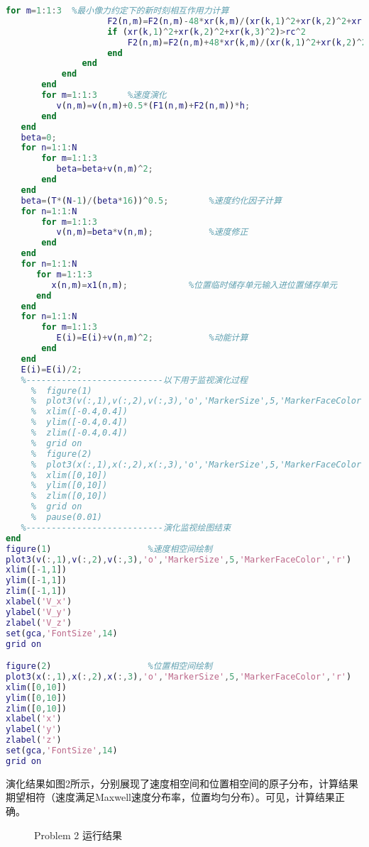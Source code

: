 \documentclass{article}
\begin{document}
\begin{lstlisting}[language=MATLAB]
               for m=1:1:3	%最小像力约定下的新时刻相互作用力计算
                    F2(n,m)=F2(n,m)-48*xr(k,m)/(xr(k,1)^2+xr(k,2)^2+xr(k,3)^2)^7+24*xr(k,m)/(xr(k,1)^2+xr(k,2)^2+xr(k,3)^2)^4;
                    if (xr(k,1)^2+xr(k,2)^2+xr(k,3)^2)>rc^2
                        F2(n,m)=F2(n,m)+48*xr(k,m)/(xr(k,1)^2+xr(k,2)^2+xr(k,3)^2)^7-24*xr(k,m)/(xr(k,1)^2+xr(k,2)^2+xr(k,3)^2)^4;	%截断修正
                    end
               end
           end
       end
       for m=1:1:3		%速度演化
          v(n,m)=v(n,m)+0.5*(F1(n,m)+F2(n,m))*h; 
       end
   end
   beta=0;
   for n=1:1:N
       for m=1:1:3
          beta=beta+v(n,m)^2; 
       end
   end
   beta=(T*(N-1)/(beta*16))^0.5;		%速度约化因子计算
   for n=1:1:N
       for m=1:1:3
          v(n,m)=beta*v(n,m); 			%速度修正
       end
   end
   for n=1:1:N
      for m=1:1:3
         x(n,m)=x1(n,m); 			%位置临时储存单元输入进位置储存单元
      end
   end
   for n=1:1:N
       for m=1:1:3
          E(i)=E(i)+v(n,m)^2; 			%动能计算
       end
   end
   E(i)=E(i)/2;
   %---------------------------以下用于监视演化过程
     %  figure(1)
     %  plot3(v(:,1),v(:,2),v(:,3),'o','MarkerSize',5,'MarkerFaceColor','r')
     %  xlim([-0.4,0.4])
     %  ylim([-0.4,0.4])
     %  zlim([-0.4,0.4])
     %  grid on
     %  figure(2)
     %  plot3(x(:,1),x(:,2),x(:,3),'o','MarkerSize',5,'MarkerFaceColor','r')
     %  xlim([0,10])
     %  ylim([0,10])
     %  zlim([0,10])
     %  grid on
     %  pause(0.01)
   %---------------------------演化监视绘图结束
end
figure(1)					%速度相空间绘制
plot3(v(:,1),v(:,2),v(:,3),'o','MarkerSize',5,'MarkerFaceColor','r')
xlim([-1,1])
ylim([-1,1])
zlim([-1,1])
xlabel('V_x')
ylabel('V_y')
zlabel('V_z')
set(gca,'FontSize',14)
grid on

figure(2)					%位置相空间绘制
plot3(x(:,1),x(:,2),x(:,3),'o','MarkerSize',5,'MarkerFaceColor','r')
xlim([0,10])
ylim([0,10])
zlim([0,10])
xlabel('x')
ylabel('y')
zlabel('z')
set(gca,'FontSize',14)
grid on
\end{lstlisting}

演化结果如图2所示，分别展现了速度相空间和位置相空间的原子分布，计算结果期望相符（速度满足Maxwell速度分布率，位置均匀分布）。可见，计算结果正确。

\begin{figure}[tbp]
  \caption{Problem 2 运行结果}
\end{figure}
\end{document}
